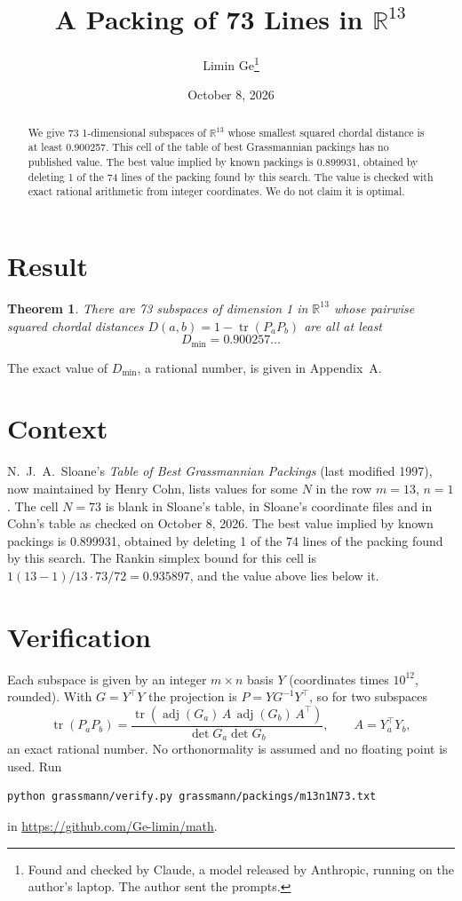 \documentclass[11pt,a4paper]{article}
\title{A Packing of 73 Lines in $\mathbb{R}^{13}$}
\author{Limin Ge\thanks{Found and checked by Claude, a model released by Anthropic, running on the author's laptop. The author sent the prompts.}}
\date{October 8, 2026}
\newtheorem*{theorem}{Theorem}
\begin{document}
\maketitle
\begin{abstract}
We give 73 1-dimensional subspaces of $\mathbb{R}^{13}$ whose smallest squared chordal distance is at least 0.900257. This cell of the table of best Grassmannian packings has no published value. The best value implied by known packings is 0.899931, obtained by deleting 1 of the 74 lines of the packing found by this search. The value is checked with exact rational arithmetic from integer coordinates. We do not claim it is optimal.
\end{abstract}

\section{Result}
\begin{theorem}
There are 73 subspaces of dimension 1 in $\mathbb{R}^{13}$ whose pairwise squared chordal distances $D(a,b) = 1 - \operatorname{tr}(P_aP_b)$ are all at least
\[ D_{\min} = 0.900257\ldots \]
\end{theorem}
The exact value of $D_{\min}$, a rational number, is given in Appendix~A.


\section{Context}
N.~J.~A.~Sloane's \emph{Table of Best Grassmannian Packings} (last modified 1997), now maintained by Henry Cohn, lists values for some $N$ in the row $m=13$, $n=1$. The cell $N=73$ is blank in Sloane's table, in Sloane's coordinate files and in Cohn's table as checked on October 8, 2026. The best value implied by known packings is 0.899931, obtained by deleting 1 of the 74 lines of the packing found by this search. The Rankin simplex bound for this cell is $1(13-1)/13\cdot 73/72 = 0.935897$, and the value above lies below it.


\section{Verification}
Each subspace is given by an integer $m\times n$ basis $Y$ (coordinates times $10^{12}$, rounded). With $G=Y^\top Y$ the projection is $P=YG^{-1}Y^\top$, so for two subspaces
\[ \operatorname{tr}(P_aP_b)=\frac{\operatorname{tr}(\operatorname{adj}(G_a)\,A\,\operatorname{adj}(G_b)\,A^\top)}{\det G_a\det G_b},\qquad A=Y_a^\top Y_b, \]
an exact rational number. No orthonormality is assumed and no floating point is used. Run
\begin{verbatim}
python grassmann/verify.py grassmann/packings/m13n1N73.txt
\end{verbatim}
in \url{https://github.com/Ge-limin/math}.
\end{document}
